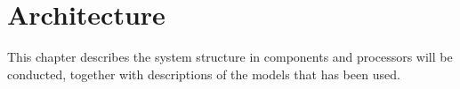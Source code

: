 \chapter{Architecture}
This chapter describes the system structure in components and processors will be conducted, together with descriptions of the models that has been used.


